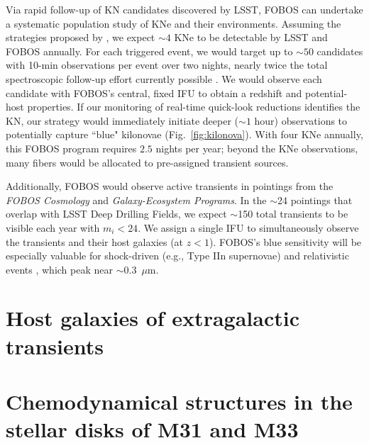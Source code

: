 \documentclass[11pt,a4paper,twoside,onecolumn,openany,final,oldfontcommands]{memoir}
\begin{document}
Via rapid follow-up of KN candidates discovered by LSST, FOBOS can undertake a systematic population study of KNe and their environments. Assuming the strategies proposed by \citet{margutti2018}, we expect $\sim4$ KNe to be detectable by LSST and FOBOS annually. For each triggered event, we would target up to $\sim50$ candidates with 10-min observations per event over two nights, nearly twice the total spectroscopic follow-up effort currently possible \citep{hosseinzadeh2019}. We would observe each candidate with FOBOS's central, fixed IFU to obtain a redshift and potential-host properties.  If our monitoring of real-time quick-look reductions identifies the KN, our strategy would immediately initiate deeper ($\sim1$ hour) observations to potentially capture ``blue" kilonovae (Fig.~\ref{fig:kilonova}).  With four KNe annually, this FOBOS program requires $2.5$ nights per year; beyond the KNe observations, many fibers would be allocated to pre-assigned transient sources.

Additionally, FOBOS would observe active transients in pointings from the \textit{FOBOS Cosmology} and \textit{Galaxy-Ecosystem Programs}.  In the $\sim$24 pointings that overlap with LSST Deep Drilling Fields, we expect $\sim$150 total transients to be visible each year with $m_i<24$. We assign a single IFU to simultaneously observe the transients and their host galaxies (at $z<1$). FOBOS's blue sensitivity will be especially valuable for shock-driven (e.g., Type IIn supernovae) and relativistic events \citep[e.g., the atypically bright Type Ib supernova AT 2018cow;][]{margutti2019}, which peak near $\sim$0.3~$\mu$m. 


\section{Host galaxies of extragalactic transients}

\section{Chemodynamical structures in the stellar disks of M31 and M33}
\end{document}
